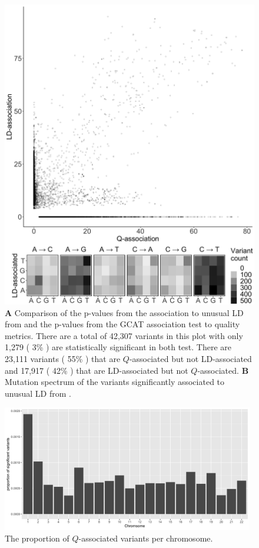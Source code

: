 \documentclass[9pt,lineno]{template}
\begin{document}
\begin{figure}[tbp]
\centering
\includegraphics[width=13cm,keepaspectratio]{../Figures/Mafessoni_MutSpect.jpg}
\caption{ \textbf{A} Comparison of the p-values from the association to unusual LD from \cite{mafessoni2018turning} and the p-values from the GCAT association test to quality metrics.
There are a total of 42,307 variants in this plot with only 1,279 ( 3\% ) are statistically significant in both test.
There are 23,111  variants ( 55\% ) that are $Q$-associated but not LD-associated and 17,917 ( 42\% ) that are LD-associated but not $Q$-associated.
\textbf{B} Mutation spectrum of the variants significantly associated to unusual LD from \cite{mafessoni2018turning}. }  
\label{Mafessoni_MutSpect}
\end{figure}

\begin{figure}[tbp]
\centering
\includegraphics[width=11cm,keepaspectratio]{../Figures/CountPerChrom.jpg}
\caption{The proportion of $Q$-associated variants per chromosome.}  
\label{CountPerChrom}
\end{figure}
\end{document}
